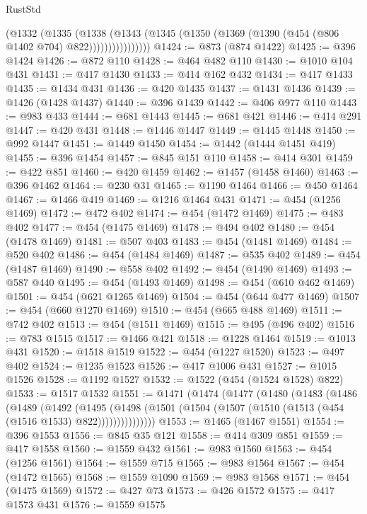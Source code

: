 \begin{lexlean}{RustStd}
\begin{coremodule}
{\begin{coremodule}
{{{{{{{{{{{{{{{{{{{{{{{{{{{{{{{{                  (@1332
                    (@1335
                      (@1338
                        (@1343
                          (@1345 (@1350 (@1369 (@1390 (@454 (@806 @1402 @704) @822))))))))))))))))
@1424 := @873 (@874 @1422)
@1425 := @396 @1424
@1426 := @872 @110
@1428 := @464 @482 @110
@1430 := @1010 @104 @431
@1431 := @417 @1430
@1433 := @414 @162 @432
@1434 := @417 @1433
@1435 := @1434 @431
@1436 := @420 @1435
@1437 := @1431 @1436
@1439 := @1426 (@1428 @1437)
@1440 := @396 @1439
@1442 := @406 @977 @110
@1443 := @983 @433
@1444 := @681 @1443
@1445 := @681 @421
@1446 := @414 @291
@1447 := @420 @431
@1448 := @1446 @1447
@1449 := @1445 @1448
@1450 := @992 @1447
@1451 := @1449 @1450
@1454 := @1442 (@1444 @1451 @419)
@1455 := @396 @1454
@1457 := @845 @151 @110
@1458 := @414 @301
@1459 := @422 @851
@1460 := @420 @1459
@1462 := @1457 (@1458 @1460)
@1463 := @396 @1462
@1464 := @230 @31
@1465 := @1190 @1464
@1466 := @450 @1464
@1467 := @1466 @419
@1469 := @1216 @1464 @431
@1471 := @454 (@1256 @1469)
@1472 := @472 @402
@1474 := @454 (@1472 @1469)
@1475 := @483 @402
@1477 := @454 (@1475 @1469)
@1478 := @494 @402
@1480 := @454 (@1478 @1469)
@1481 := @507 @403
@1483 := @454 (@1481 @1469)
@1484 := @520 @402
@1486 := @454 (@1484 @1469)
@1487 := @535 @402
@1489 := @454 (@1487 @1469)
@1490 := @558 @402
@1492 := @454 (@1490 @1469)
@1493 := @587 @440
@1495 := @454 (@1493 @1469)
@1498 := @454 (@610 @462 @1469)
@1501 := @454 (@621 @1265 @1469)
@1504 := @454 (@644 @477 @1469)
@1507 := @454 (@660 @1270 @1469)
@1510 := @454 (@665 @488 @1469)
@1511 := @742 @402
@1513 := @454 (@1511 @1469)
@1515 := @495 (@496 @402)
@1516 := @783 @1515
@1517 := @1466 @421
@1518 := @1228 @1464
@1519 := @1013 @431
@1520 := @1518 @1519
@1522 := @454 (@1227 @1520)
@1523 := @497 @402
@1524 := @1235 @1523
@1526 := @417 @1006 @431
@1527 := @1015 @1526
@1528 := @1192 @1527
@1532 := @1522 (@454 (@1524 @1528) @822)
@1533 := @1517 @1532
@1551 := @1471
    (@1474
      (@1477
        (@1480
          (@1483
            (@1486
              (@1489
                (@1492
                  (@1495
                    (@1498
                      (@1501 (@1504 (@1507 (@1510 (@1513 (@454 (@1516 @1533) @822)))))))))))))))
@1553 := @1465 (@1467 @1551)
@1554 := @396 @1553
@1556 := @845 @35 @121
@1558 := @414 @309 @851
@1559 := @417 @1558
@1560 := @1559 @432
@1561 := @983 @1560
@1563 := @454 (@1256 @1561)
@1564 := @1559 @715
@1565 := @983 @1564
@1567 := @454 (@1472 @1565)
@1568 := @1559 @1090
@1569 := @983 @1568
@1571 := @454 (@1475 @1569)
@1572 := @427 @73
@1573 := @426 @1572
@1575 := @417 @1573 @431
@1576 := @1559 @1575
}}}}}}}}}}}}}}}}}}}}}}}}}}}}}}}}
\end{coremodule}}
\end{coremodule}
\end{lexlean}
